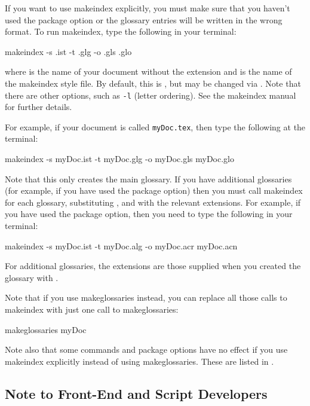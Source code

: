 \documentclass[report,inlinetitle]{nlctdoc}
\begin{document}
If you want to use \gls{makeindex} explicitly, you must
make sure that you haven't used the  package
option or the glossary entries will be written in the wrong
format. To run \gls*{makeindex}, type the following in
your terminal:
\begin{prompt}
makeindex -s .ist -t .glg -o .gls .glo
\end{prompt}
where  is the name of your document without the
 extension and  is the 
name of the \gls{makeindex} style file. By default, this is
, but may be changed via
. Note that there are other options, 
such as \texttt{-l} (letter ordering). See the \gls*{makeindex}
manual for further details.

For example, if your document is called \texttt{myDoc.tex}, then
type the following at the terminal:
\begin{prompt}
makeindex -s myDoc.ist -t myDoc.glg -o myDoc.gls myDoc.glo
\end{prompt}
Note that this only creates the main glossary. If you have
additional glossaries (for example, if you have used the
 package option) then you must call 
\gls{makeindex} for each glossary, substituting 
,  and  with the
relevant extensions. For example, if you have used the
 package option, then you need to type the
following in your terminal:
\begin{prompt}
makeindex -s myDoc.ist -t myDoc.alg -o myDoc.acr myDoc.acn
\end{prompt}
For additional glossaries, the extensions are those supplied
when you created the glossary with .

Note that if you use \gls{makeglossaries} instead, you can
replace all those calls to \gls{makeindex} with just one call
to \gls*{makeglossaries}:
\begin{prompt}
makeglossaries myDoc
\end{prompt}
Note also that some commands and package options have no effect if 
you use \gls*{makeindex} explicitly instead of using 
\gls{makeglossaries}. These are listed in 
.


\subsection{Note to Front-End and Script Developers}
\label{sec:notedev}
\end{document}
